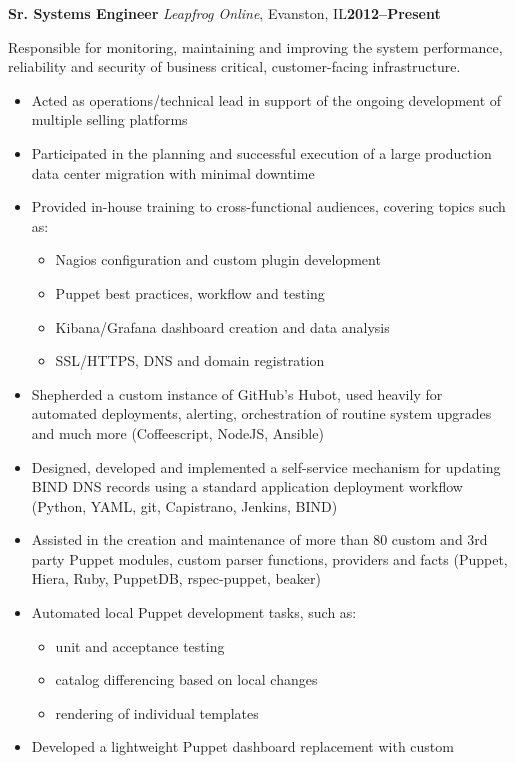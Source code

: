 \documentclass[10pt,letterpaper]{article}
\newcommand{\cventry}[5]{%
{\bfseries{#2}} {\small{\textit{#3}, #4}}\hfill {\small\bfseries{#1}}
\begin{small}\begin{adjustwidth}{1em}{2em}{\raggedright{#5}}\end{adjustwidth}\end{small}
}
\begin{document}
\cventry{2012--Present}{Sr. Systems Engineer}{Leapfrog Online}{Evanston, IL}{%
{Responsible for monitoring, maintaining and improving the system performance,
reliability and security of business critical, customer-facing infrastructure.}

\begin{itemize}
\item Acted as operations/technical lead in support of the ongoing
      development of multiple selling platforms
\item Participated in the planning and successful execution of a large
      production data center migration with minimal downtime
\item Provided in-house training to cross-functional audiences, covering
      topics such as:
\begin{itemize}
  \item Nagios configuration and custom plugin development
  \item Puppet best practices, workflow and testing
  \item Kibana/Grafana dashboard creation and data analysis
  \item SSL/HTTPS, DNS and domain registration
\end{itemize}
\item Shepherded a custom instance of GitHub's Hubot, used heavily for
      automated deployments, alerting, orchestration of routine system
      upgrades and much more (Coffeescript, NodeJS, Ansible)
\item Designed, developed and implemented a self-service mechanism for updating
      BIND DNS records using a standard application deployment workflow (Python,
      YAML, git, Capistrano, Jenkins, BIND)
\item Assisted in the creation and maintenance of more than 80 custom and 3rd
      party Puppet modules, custom parser functions, providers and facts
      (Puppet, Hiera, Ruby, PuppetDB, rspec-puppet, beaker)
\item Automated local Puppet development tasks, such as:
  \begin{itemize}
    \item unit and acceptance testing
    \item catalog differencing based on local changes
    \item rendering of individual templates
  \end{itemize}
\item Developed a lightweight Puppet dashboard replacement with custom

\end{itemize}}
\end{document}
